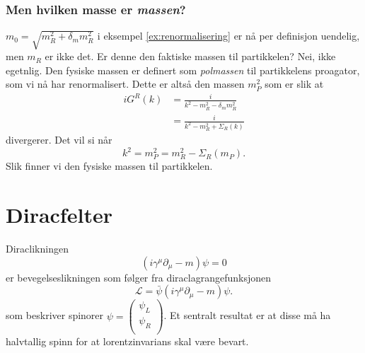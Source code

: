 \documentclass{article}
\renewcommand{\L}{\mathcal{L}}
\begin{document}
\subsubsection{Men hvilken masse er \emph{massen}?}
$m_0 = \sqrt{m_R^2 + \delta_m m_R^2}$ i eksempel \ref{ex:renormalisering} er nå per definisjon uendelig, men $m_R$ er ikke det.
Er denne den faktiske massen til partikkelen?
Nei, ikke egetnlig.
Den fysiske massen er definert som \emph{polmassen} til partikkelens proagator, som vi nå har renormalisert. 
Dette er altså den massen $m_P^2$ som er slik at 
\begin{equation*}
    \begin{split}
        iG^R(k) 
        &= \frac{i}{k^2 - m_R^2 - \delta_m m_R^2} \\
        &= \frac{i}{k^2 - m_R^2 + \Sigma_R(k)}
    \end{split}
\end{equation*}
divergerer.
Det vil si når
\begin{equation*}
    k^2 = m_P^2 = m_R^2 - \Sigma_R(m_P).
\end{equation*}
Slik finner vi den fysiske massen til partikkelen.

\section{Diracfelter}
Diraclikningen
\begin{equation*}
    (i \gamma^\mu \partial_\mu - m) \psi = 0
\end{equation*}
er bevegelseslikningen som følger fra diraclagrangefunksjonen
\begin{equation*}
    \L = \bar{\psi} (i \gamma^\mu \partial_\mu - m) \psi.
\end{equation*}
som beskriver spinorer $\psi = \begin{pmatrix} \psi_L \\ \psi_R \\ \end{pmatrix}$. 
Et sentralt resultat er at disse må ha halvtallig spinn for at lorentzinvarians skal være bevart.
\end{document}
